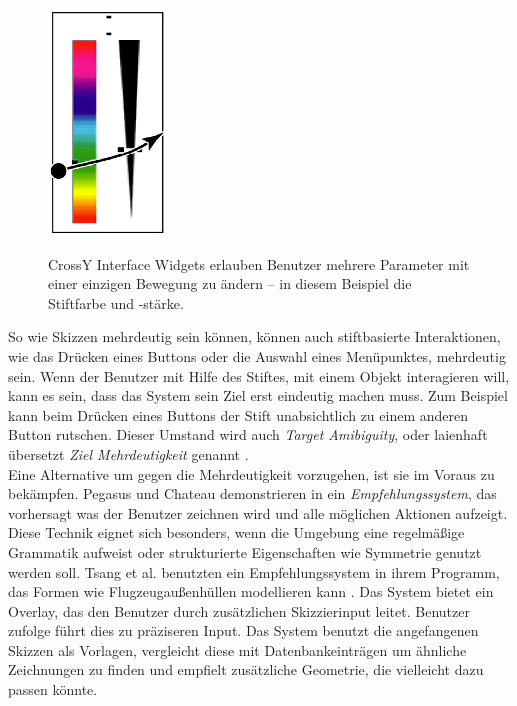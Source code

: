 \begin{figure}[bth]
	\begin{center}
	
	{\includegraphics[width=0.3\linewidth]{gfx/accotCrossY}}
	\caption[CrossY \newline \citep{Johnson:2009}]{CrossY Interface Widgets erlauben Benutzer mehrere Parameter mit einer einzigen Bewegung zu ändern -- in diesem Beispiel die Stiftfarbe und -stärke.}
	\label{fig:accotCrossY}
	\end{center}
\end{figure}

\medskip So wie Skizzen mehrdeutig sein können, können auch stiftbasierte Interaktionen, wie das Drücken eines Buttons oder die Auswahl eines Menüpunktes, mehrdeutig sein. Wenn der Benutzer mit Hilfe des Stiftes, mit einem Objekt interagieren will, kann es sein, dass das System sein Ziel erst eindeutig machen muss. Zum Beispiel kann beim Drücken eines Buttons der Stift unabsichtlich zu einem anderen Button rutschen. Dieser Umstand wird auch \emph{Target Amibiguity}, oder laienhaft übersetzt \emph{Ziel Mehrdeutigkeit} genannt \citep{Mankoff:2000p77,Mankoff:2000}. \\
Eine Alternative um gegen die Mehrdeutigkeit vorzugehen, ist sie im Voraus zu bekämpfen. Pegasus und Chateau demonstrieren in \citep{Igarashi:2001,Igarashi:2003} ein \emph{Empfehlungssystem}, das vorhersagt was der Benutzer zeichnen wird und alle möglichen Aktionen aufzeigt. Diese Technik eignet sich besonders, wenn die Umgebung eine regelmäßige Grammatik aufweist oder strukturierte Eigenschaften wie Symmetrie genutzt werden soll.
Tsang et al. benutzten ein Empfehlungssystem in ihrem Programm, das Formen wie Flugzeugaußenhüllen modellieren kann \citep{Tsang:2004}. Das System bietet ein Overlay, das den Benutzer durch zusätzlichen Skizzierinput leitet. Benutzer zufolge führt dies zu präziseren Input. Das System benutzt die angefangenen Skizzen als Vorlagen, vergleicht diese mit Datenbankeinträgen um ähnliche Zeichnungen zu finden und empfielt zusätzliche Geometrie, die vielleicht dazu passen könnte.

